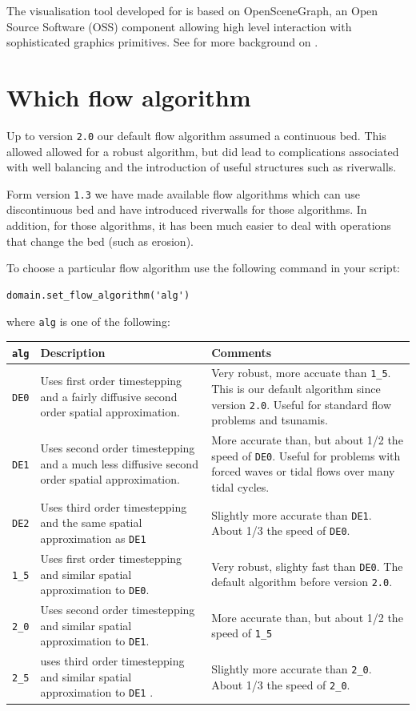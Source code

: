 \documentclass{manual}
\begin{document}
The visualisation tool developed for \anuga is based on
OpenSceneGraph, an Open Source Software (OSS) component allowing high
level interaction with sophisticated graphics primitives.
See \cite{nielsen2005} for more background on \anuga.


 
\section{Which flow algorithm}
\label{ch:algorithm}

Up to version \verb|2.0| our default flow algorithm assumed  a continuous 
bed. This allowed allowed for a robust algorithm, but did lead to complications
associated with well balancing and the introduction of useful structures such as riverwalls. 

Form version \verb|1.3| we have made available flow algorithms which can use 
discontinuous bed and have introduced riverwalls for those algorithms. In addition,
for those algorithms, it has been much easier to deal with operations that change the bed (such as erosion).

To choose a particular flow algorithm use the following command in your \anuga{} script:
\begin{verbatim}
domain.set_flow_algorithm('alg')
\end{verbatim}
where \verb|alg| is one of the following:
\begin{center}
\begin{tabular}{| l |p{6cm}  |p{6cm}| }
  \hline \hline      
  \verb|alg| & Description & Comments \\ \hline                  
  \verb|DE0| & Uses first order timestepping and a fairly diffusive second order spatial approximation. & Very robust, more accuate than \verb|1_5|. This is our default algorithm since version \verb|2.0|. Useful for standard flow problems and tsunamis. \\ \hline 
   \verb|DE1| & Uses second order timestepping and a much less diffusive second order spatial approximation.  &More accurate than, but about 1/2 the speed of \verb|DE0|. Useful for problems with forced waves or tidal flows over many tidal cycles. \\ \hline 
   \verb|DE2| & Uses third order timestepping and the same spatial approximation as \verb|DE1| & Slightly more accurate than \verb|DE1|. About 1/3 the speed of \verb|DE0|. \\ \hline 
  \hline 
  \verb|1_5| &  Uses first order timestepping and similar spatial approximation to \verb|DE0|. & Very  robust, slighty fast than \verb|DE0|. The default algorithm before version \verb|2.0|. \\ \hline 
   \verb|2_0| & Uses second order timestepping and similar spatial approximation to \verb|DE1|.  &More accurate than, but  about 1/2 the speed of \verb|1_5| \\ \hline 
   \verb|2_5| & uses third order timestepping  and similar spatial approximation to \verb|DE1| . & Slightly more accurate than \verb|2_0|.  About 1/3 the speed of \verb|2_0|.\\    \hline 
     \hline
\end{tabular}
\end{center}
\end{document}

